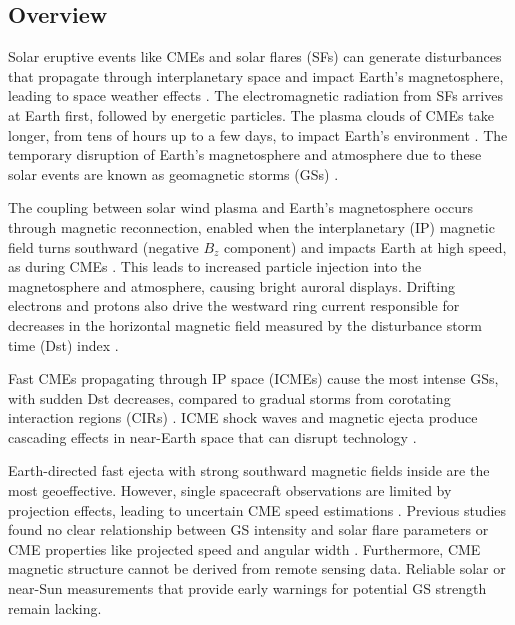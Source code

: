 \subsection{Overview}
Solar eruptive events like CMEs and solar flares (SFs) can generate disturbances that propagate through interplanetary space and impact Earth's magnetosphere, leading to space weather effects \citep{fletcher_2011, webb_2012, klein_2017, temmer_2021}. The electromagnetic radiation from SFs arrives at Earth first, followed by energetic particles. The plasma clouds of CMEs take longer, from tens of hours up to a few days, to impact Earth's environment \citep{malandraki_2018, gopalswamy_sun_sw_2022}. The temporary disruption of Earth's magnetosphere and atmosphere due to these solar events are known as geomagnetic storms (GSs) \citep{gonzalez_1994, saiz_2013, lakhina_2016}.

The coupling between solar wind plasma and Earth's magnetosphere occurs through magnetic reconnection, enabled when the interplanetary (IP) magnetic field turns southward (negative $B_z$ component) and impacts Earth at high speed, as during CMEs \citep{dungey_1961, akasofu_1981, echer_2022}. This leads to increased particle injection into the magnetosphere and atmosphere, causing bright auroral displays. Drifting electrons and protons also drive the westward ring current responsible for decreases in the horizontal magnetic field measured by the disturbance storm time (Dst) index \citep{gonzalez_1994, saiz_2013, lakhina_2016}.

Fast CMEs propagating through IP space (ICMEs) cause the most intense GSs, with sudden Dst decreases, compared to gradual storms from corotating interaction regions (CIRs) \citep{tsurutani_1997, zhang_2007, wu_2016, borovsky_2006}. ICME shock waves and magnetic ejecta produce cascading effects in near-Earth space that can disrupt technology \citep{pulkkinen_2007}.

Earth-directed fast ejecta with strong southward magnetic fields inside are the most geoeffective. However, single spacecraft observations are limited by projection effects, leading to uncertain CME speed estimations \citep{paouris_2021, kouloumvakos_2022}. Previous studies found no clear relationship between GS intensity and solar flare parameters or CME properties like projected speed and angular width \citep{samwel_2023}. Furthermore, CME magnetic structure cannot be derived from remote sensing data. Reliable solar or near-Sun measurements that provide early warnings for potential GS strength remain lacking.

